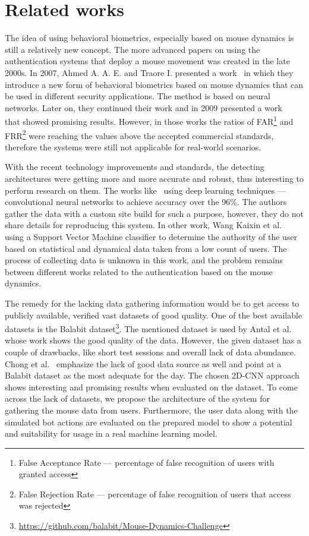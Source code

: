 \section{Related works}\label{sec:related-works}
The idea of using behavioral biometrics, especially based on mouse dynamics is still a relatively new concept.
The more advanced papers on using the authentication systems that deploy a mouse movement was created in the late 2000s.
In 2007, Ahmed A. A. E. and Traore I. presented a work~\cite{firstMouseBBPapers1} in which they introduce a new form of behavioral biometrics based on mouse dynamics that can be used in different security applications.
The method is based on neural networks.
Later on, they continued their work and in 2009 presented a work~\cite{wang2009behavioral} that showed promising results.
However, in those works the ratios of FAR\footnote{False Acceptance Rate --- percentage of false recognition of users with granted access} and FRR\footnote{False Rejection Rate --- percentage of false recognition of users that access was rejected} were reaching the values above the accepted commercial standards, therefore the systems were still not applicable for real-world scenarios.

With the recent technology improvements and standards, the detecting architectures were getting more and more accurate and robust, thus interesting to perform research on them.
The works like~\cite{a-deep-learning-approach-to-web-bot-detection-using-mouse-behavioral-biometrics} using deep learning techniques --- convolutional neural networks to achieve accuracy over the 96\%.
The authors gather the data with a custom site build for such a purpose, however, they do not share details for reproducing this system.
In other work, Wang Kaixin et al.~\cite{a-user-authentication-and-identification-model-based-on-mouse-dynamics} using a Support Vector Machine classifier to determine the authority of the user based on statistical and dynamical data taken from a low count of users.
The process of collecting data is unknown in this work, and the problem remains between different works related to the authentication based on the mouse dynamics.

The remedy for the lacking data gathering information would be to get access to publicly available, verified vast datasets of good quality.
One of the best available datasets is the Balabit dataset\footnote{\url{https://github.com/balabit/Mouse-Dynamics-Challenge}}.
The mentioned dataset is used by Antal et al.~\cite{antal2019intrusion} whose work shows the good quality of the data.
However, the given dataset has a couple of drawbacks, like short test sessions and overall lack of data abundance.
Chong et al.~\cite{Main} emphasize the lack of good data source as well and point at a Balabit dataset as the most adequate for the day.
The chosen 2D-CNN approach shows interesting and promising results when evaluated on the dataset.
To come across the lack of datasets, we propose the architecture of the system for gathering the mouse data from users.
Furthermore, the user data along with the simulated bot actions are evaluated on the prepared model to show a potential and suitability for usage in a real machine learning model.
